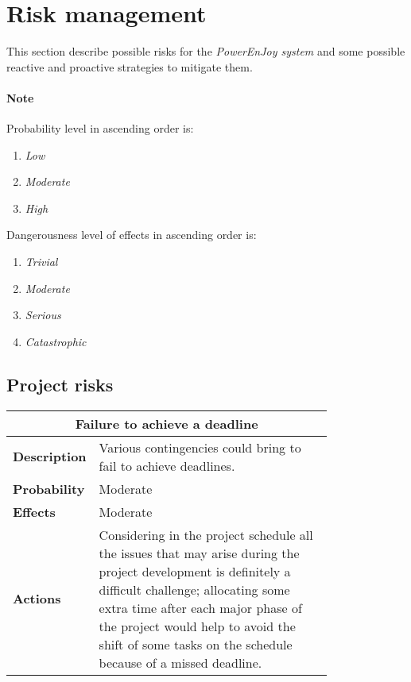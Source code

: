 \section{Risk management}\label{sec:riskManagement}
This section describe possible risks for the \emph{PowerEnJoy system} and some possible reactive and proactive strategies to mitigate them.
\paragraph{Note} Probability level in ascending order is: 
\begin{enumerate}
\item \emph{Low}
\item \emph{Moderate}
\item \emph{High}
\end{enumerate}
Dangerousness level of effects in ascending order is: \begin{enumerate}
\item \emph{Trivial}
\item \emph{Moderate}
\item \emph{Serious}
\item \emph{Catastrophic}
\end{enumerate}

\subsection{Project risks}
\begin{longtable}{lp{0.8\linewidth}}
\multicolumn{2}{c}{\textbf{Failure to achieve a deadline}}\\
\toprule
\textbf{Description}& Various contingencies could bring to fail to achieve deadlines. \\
\midrule
\textbf{Probability}&Moderate\\
\midrule
\textbf{Effects}&Moderate\\
\midrule
\textbf{Actions}& Considering in the project schedule all the issues that may arise during the project development is definitely a difficult challenge; allocating some extra time after each major phase of the project would help to avoid the shift of some tasks on the schedule because of a missed deadline.\\
\bottomrule
\end{longtable}


